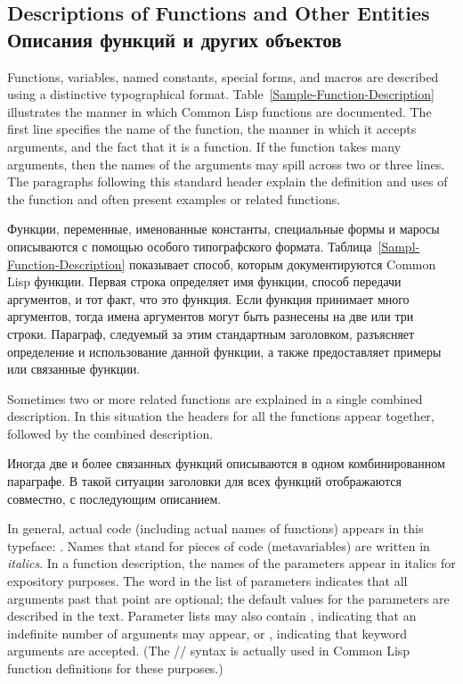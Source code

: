 \subsection{Descriptions of Functions and Other Entities Описания функций и
других объектов}
\label{FUNCTION-HEADER-NOTATION-SECTION}

Functions, variables, named constants, special forms, and macros are described
using a distinctive typographical format.
Table~\ref{Sample-Function-Description} illustrates the manner
in which Common Lisp functions are documented.
The first line specifies the name of the function,
the manner in which it accepts arguments,
and the fact that it is a function.
If the function takes many arguments, then the names of the arguments
may spill across two or three lines.
The paragraphs following this standard header
explain the definition and uses of the function and often
present examples or related functions.

Функции, переменные, именованные константы, специальные формы и маросы
описываются с помощью особого типографского формата.
Таблица~\ref{Sampl-Function-Description} показывает способ, которым
документируются Common Lisp функции.
Первая строка определяет имя функции, способ передачи аргументов, и тот факт,
что это функция.
Если функция принимает много аргументов, тогда имена аргументов могут быть
разнесены на две или три строки.
Параграф, следуемый за этим стандартным заголовком, разъясняет определение и
использование данной функции, а также предоставляет примеры или связанные
функции.

Sometimes two or more related functions are explained in a single
combined description.  In this situation the headers for all the
functions appear together, followed by the combined description.

Иногда две и более связанных функций описываются в одном комбинированном
параграфе. В такой ситуации заголовки для всех функций отображаются совместно, с
последующим описанием.

In general, actual code (including actual names of functions)
appears in this typeface: .
Names that stand for pieces of code (metavariables) are written in
{\it italics}.  In a function description, the names of the parameters appear
in italics for expository purposes.  The word  in the
list of parameters indicates that all arguments past that point are
optional; the default values for the parameters are described in the
text.  Parameter lists may also contain , indicating that an
indefinite number of arguments may appear, or , indicating
that keyword arguments are accepted.
(The //
syntax is actually used in Common Lisp function definitions for these purposes.)

